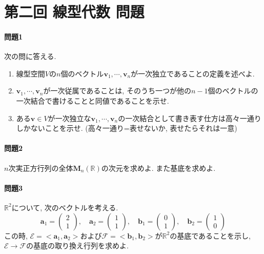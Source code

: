 \documentclass[a4j,dvipdfmx]{jsarticle}
\begin{document}
    \part*{第二回 線型代数 問題}
    \subsection*{問題1}
        次の問に答える.
        \begin{enumerate}
            \item 線型空間$V$の$n$個のベクトル$\bm{v}_1,\cdots,\bm{v}_n$が一次独立であることの定義を述べよ.
            \item $\bm{v}_1,\cdots,\bm{v}_n$が一次従属であることは, そのうち一つが他の$n-1$個のベクトルの一次結合で書けることと同値であることを示せ.
            \item ある$\bm{v}\in V$が一次独立な$\bm{v}_1,\cdots,\bm{v}_n$の一次結合として書き表す仕方は高々一通りしかないことを示せ. (高々一通り=表せないか, 表せたらそれは一意)
        \end{enumerate}
    \subsection*{問題2}
        $n$次実正方行列の全体$\bm{M}_n(\mathbb{R})$の次元を求めよ. また基底を求めよ.
    \subsection*{問題3}
        $\mathbb{R}^2$について, 次のベクトルを考える.
        \begin{equation*}
            \bm{a}_1=\begin{pmatrix}
                2 \\ 1
            \end{pmatrix},\quad
            \bm{a}_2=\begin{pmatrix}
                1 \\ 1
            \end{pmatrix},\quad
            \bm{b}_1=\begin{pmatrix}
                0 \\ 1
            \end{pmatrix},\quad
            \bm{b}_2=\begin{pmatrix}
                1 \\ 0
            \end{pmatrix}
        \end{equation*}
        この時, $\mathcal{E} = <\bm{a}_1,\bm{a}_2>$および$\mathcal{F} = <\bm{b}_1,\bm{b}_2>$が$\mathbb{R}^2$の基底であることを示し, $\mathcal{E}\to\mathcal{F}$の基底の取り換え行列を求めよ.
\end{document}
